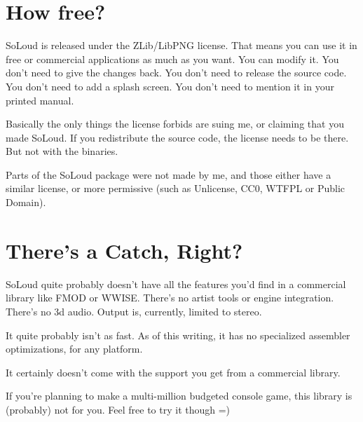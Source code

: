 \section{How free?}
SoLoud is released under the ZLib/LibPNG license. That means you can use it in free or commercial applications as much as you want. You can modify it. You don't need to give the changes back. You don't need to release the source code. You don't need to add a splash screen. You don't need to mention it in your printed manual.

Basically the only things the license forbids are suing me, or claiming that you made SoLoud. If you redistribute the source code, the license needs to be there. But not with the binaries.

Parts of the SoLoud package were not made by me, and those either have a similar license, or more permissive (such as Unlicense, CC0, WTFPL or Public Domain).

\section{There's a Catch, Right?}

SoLoud quite probably doesn't have all the features you'd find in a commercial library like FMOD or WWISE. There's no artist tools or engine integration. There's no 3d audio. Output is, currently, limited to stereo.

It quite probably isn't as fast. As of this writing, it has no specialized assembler optimizations, for any platform.

It certainly doesn't come with the support you get from a commercial library.

If you're planning to make a multi-million budgeted console game, this library is (probably) not for you. Feel free to try it though =)
